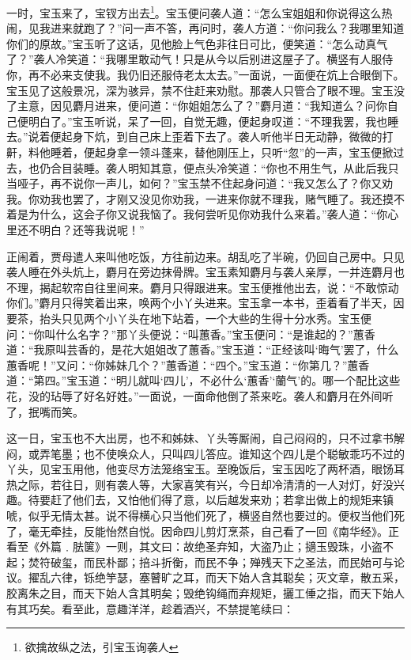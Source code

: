 \documentclass[12pt,oneside]{book}
\begin{document}
一时，宝玉来了，宝钗方出去\footnote{欲擒故纵之法，引宝玉询袭人}。宝玉便问袭人道：“怎么宝姐姐和你说得这么热闹，见我进来就跑了？”问一声不答，再问时，袭人方道：“你问我么？我哪里知道你们的原故。”宝玉听了这话，见他脸上气色非往日可比，便笑道：“怎么动真气了？”袭人冷笑道：“我哪里敢动气！只是从今以后别进这屋子了。横竖有人服侍你，再不必来支使我。我仍旧还服侍老太太去。”一面说，一面便在炕上合眼倒下。宝玉见了这般景况，深为骇异，禁不住赶来劝慰。那袭人只管合了眼不理。宝玉没了主意，因见麝月进来，便问道：“你姐姐怎么了？”麝月道：“我知道么？问你自己便明白了。”宝玉听说，呆了一回，自觉无趣，便起身叹道：“不理我罢，我也睡去。”说着便起身下炕，到自己床上歪着下去了。袭人听他半日无动静，微微的打鼾，料他睡着，便起身拿一领斗蓬来，替他刚压上，只听“忽”的一声，宝玉便掀过去，也仍合目装睡。袭人明知其意，便点头冷笑道：“你也不用生气，从此后我只当哑子，再不说你一声儿，如何？”宝玉禁不住起身问道：“我又怎么了？你又劝我。你劝我也罢了，才刚又没见你劝我，一进来你就不理我，赌气睡了。我还摸不着是为什么，这会子你又说我恼了。我何尝听见你劝我什么来着。”袭人道：“你心里还不明白？还等我说呢！”

正闹着，贾母遣人来叫他吃饭，方往前边来。胡乱吃了半碗，仍回自己房中。只见袭人睡在外头炕上，麝月在旁边抹骨牌。宝玉素知麝月与袭人亲厚，一并连麝月也不理，揭起软帘自往里间来。麝月只得跟进来。宝玉便推他出去，说：“不敢惊动你们。”麝月只得笑着出来，唤两个小丫头进来。宝玉拿一本书，歪着看了半天，因要茶，抬头只见两个小丫头在地下站着，一个大些的生得十分水秀。宝玉便问：“你叫什么名字？”那丫头便说：“叫蕙香。”宝玉便问：“是谁起的？”蕙香道：“我原叫芸香的，是花大姐姐改了蕙香。”宝玉道：“正经该叫‘晦气’罢了，什么蕙香呢！”又问：“你姊妹几个？”蕙香道：“四个。”宝玉道：“你第几？”蕙香道：“第四。”宝玉道：“明儿就叫‘四儿’，不必什么‘蕙香’‘蘭气’的。哪一个配比这些花，没的玷辱了好名好姓。”一面说，一面命他倒了茶来吃。袭人和麝月在外间听了，抿嘴而笑。

这一日，宝玉也不大出房，也不和姊妹、丫头等厮闹，自己闷闷的，只不过拿书解闷，或弄笔墨；也不使唤众人，只叫四儿答应。谁知这个四儿是个聪敏乖巧不过的丫头，见宝玉用他，他变尽方法笼络宝玉。至晚饭后，宝玉因吃了两杯酒，眼饧耳热之际，若往日，则有袭人等，大家喜笑有兴，今日却冷清清的一人对灯，好没兴趣。待要赶了他们去，又怕他们得了意，以后越发来劝；若拿出做上的规矩来镇唬，似乎无情太甚。说不得横心只当他们死了，横竖自然也要过的。便权当他们死了，毫无牵挂，反能怡然自悦。因命四儿剪灯烹茶，自己看了一回《南华经》。正看至《外篇﹒胠箧》一则，其文曰：故绝圣弃知，大盗乃止；擿玉毁珠，小盗不起；焚符破玺，而民朴鄙；掊斗折衡，而民不争；殚残天下之圣法，而民始可与论议。擢乱六律，铄绝竽瑟，塞瞽旷之耳，而天下始人含其聪矣；灭文章，散五采，胶离朱之目，而天下始人含其明矣；毁绝钩绳而弃规矩，攦工倕之指，而天下始人有其巧矣。看至此，意趣洋洋，趁着酒兴，不禁提笔续曰：
\end{document}
